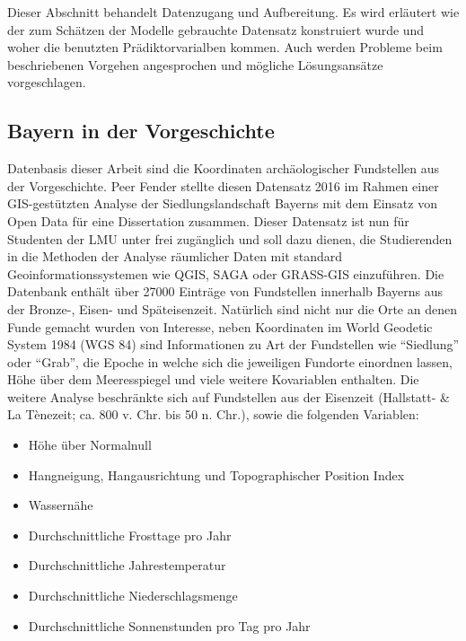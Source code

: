 Dieser Abschnitt behandelt Datenzugang und Aufbereitung. Es wird erläutert wie der zum Schätzen der Modelle gebrauchte Datensatz konstruiert wurde und woher die benutzten Prädiktorvarialben kommen. Auch werden Probleme beim beschriebenen Vorgehen angesprochen und mögliche Lösungsansätze vorgeschlagen.

\subsection{Bayern in der Vorgeschichte}
Datenbasis dieser Arbeit sind die Koordinaten archäologischer Fundstellen aus der Vorgeschichte. Peer Fender stellte diesen Datensatz 2016 im Rahmen einer GIS-gestützten Analyse der Siedlungslandschaft Bayerns mit dem Einsatz von Open Data für eine Dissertation zusammen. \cite{fender2017bayern} Dieser Datensatz ist nun für Studenten der LMU unter \cite{Datenbank} frei zugänglich und soll dazu dienen, die Studierenden in die Methoden der Analyse räumlicher Daten mit standard Geoinformationssystemen wie QGIS, SAGA oder GRASS-GIS einzuführen. Die Datenbank enthält über 27000 Einträge von Fundstellen innerhalb Bayerns aus der Bronze-, Eisen- und Späteisenzeit. Natürlich sind nicht nur die Orte an denen Funde gemacht wurden von Interesse, neben Koordinaten im World Geodetic System 1984 (WGS 84) sind Informationen zu Art der Fundstellen wie ``Siedlung'' oder ``Grab'', die Epoche in welche sich die jeweiligen Fundorte einordnen lassen, Höhe über dem Meeresspiegel und viele weitere Kovariablen enthalten. Die weitere Analyse beschränkte sich auf Fundstellen aus der Eisenzeit (Hallstatt- \& La Tènezeit; ca. 800 v. Chr. bis 50 n. Chr.), sowie die folgenden Variablen: 
\begin{itemize}
    \item Höhe über Normalnull
    \item Hangneigung, Hangausrichtung und Topographischer Position Index
    \item Wassernähe 
    \item Durchschnittliche Frosttage pro Jahr
    \item Durchschnittliche Jahrestemperatur
    \item Durchschnittliche Niederschlagsmenge
    \item Durchschnittliche Sonnenstunden pro Tag pro Jahr
\end{itemize}
